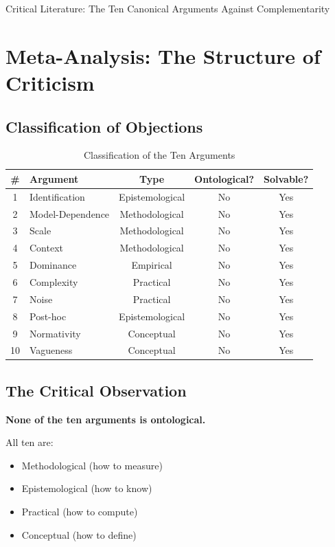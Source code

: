\begin{chapter}{Critical Literature: The Ten Canonical Arguments Against Complementarity}
\section{Meta-Analysis: The Structure of Criticism}
\label{sec:meta-analysis}

\subsection{Classification of Objections}

\begin{table}[h]
\centering
\caption{Classification of the Ten Arguments}
\label{tab:argument-classification}
\renewcommand{\arraystretch}{1.3}
\begin{tabular}{@{}clccc@{}}
\toprule
\textbf{\#} & \textbf{Argument} & \textbf{Type} & \textbf{Ontological?} & \textbf{Solvable?} \\
\midrule
1 & Identification & Epistemological & No & Yes \\
2 & Model-Dependence & Methodological & No & Yes \\
3 & Scale & Methodological & No & Yes \\
4 & Context & Methodological & No & Yes \\
5 & Dominance & Empirical & No & Yes \\
6 & Complexity & Practical & No & Yes \\
7 & Noise & Practical & No & Yes \\
8 & Post-hoc & Epistemological & No & Yes \\
9 & Normativity & Conceptual & No & Yes \\
10 & Vagueness & Conceptual & No & Yes \\
\bottomrule
\end{tabular}
\end{table}

\subsection{The Critical Observation}

\begin{tcolorbox}[colback=green!5!white,colframe=green!75!black,title=\textbf{Central Finding}]
\textbf{None of the ten arguments is ontological.}

All ten are:
\begin{itemize}[noitemsep]
    \item Methodological (how to measure)
    \item Epistemological (how to know)
    \item Practical (how to compute)
    \item Conceptual (how to define)
\end{itemize}


\end{tcolorbox}
\end{chapter}
